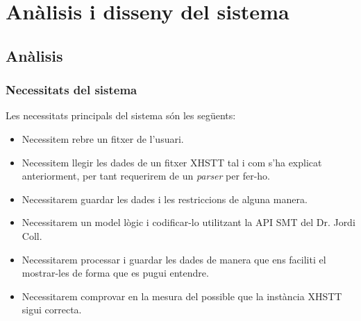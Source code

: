 \documentclass[11pt,a4paper,twoside]{report}
\begin{document}
  \chapter{Anàlisis i disseny del sistema}

  \section{Anàlisis}
  \subsection{Necessitats del sistema}
  Les necessitats principals del sistema són les següents: 
  \begin{itemize}
    \item Necessitem rebre un fitxer de l'usuari.
    \item Necessitem llegir les dades de un fitxer XHSTT tal i com s'ha explicat anteriorment, per tant requerirem de un \textit{parser} per fer-ho.
    \item Necessitarem guardar les dades i les restriccions de alguna manera.
    \item Necessitarem un model lògic i codificar-lo utilitzant la API SMT del Dr. Jordi Coll. 
    \item Necessitarem processar i guardar les dades de manera que ens faciliti el mostrar-les de forma que es pugui entendre.
    \item Necessitarem comprovar en la mesura del possible que la instància XHSTT sigui correcta.
  \end{itemize}
\end{document}
